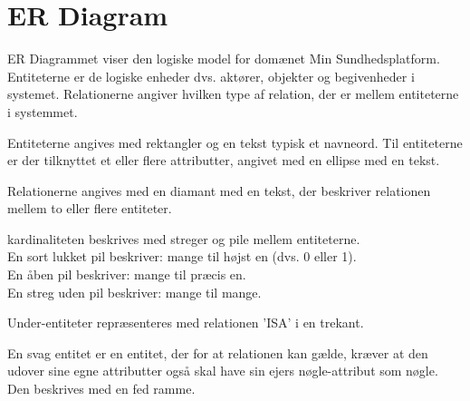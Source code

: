 \section{ER Diagram}
ER Diagrammet viser den logiske model for domænet Min Sundhedsplatform. \\
Entiteterne er de logiske enheder dvs. aktører, objekter og begivenheder i systemet. 
Relationerne angiver hvilken type af relation, der er mellem entiteterne i systemmet.

Entiteterne angives med rektangler og en tekst typisk et navneord. Til entiteterne er der tilknyttet et eller flere attributter, angivet med en ellipse med en tekst.

Relationerne angives med en diamant med en  tekst, der beskriver relationen mellem to eller flere entiteter.

kardinaliteten beskrives med streger og pile mellem entiteterne. \\ 
En sort lukket pil beskriver: mange til højst en (dvs. 0 eller 1).\\
En åben pil beskriver: mange til præcis en.\\
En streg uden pil beskriver: mange til mange.

Under-entiteter repræsenteres med relationen 'ISA' i en trekant.

En svag entitet er en entitet, der for at relationen kan gælde, kræver at den udover sine egne attributter også skal have sin ejers nøgle-attribut som nøgle. Den beskrives med en fed ramme.

